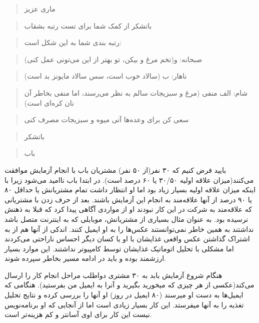 \begin{quote}
ماری عزیز
\end{quote}

\begin{quote}
باتشکر از کمک شما برای تست رتبه بشقاب
\end{quote}

\begin{quote}
رتبه بندی شما به این شکل است:
\end{quote}

\begin{quote}
صبحانه: و(تخم مرغ و بیکن، تو بهتر از این می‌تونی عمل کنی)
\end{quote}

\begin{quote}
ناهار: ب (سالاد خوب است، سس سالاد مایونز بد است)
\end{quote}

\begin{quote}
شام: الف منفی (مرغ و سبزیجات سالم به نظر می‌رسند، اما منفی بخاطر آن نان
کره‌ای است)
\end{quote}

\begin{quote}
سعی کن برای وعده‌ها آتی میوه و سبزیجات مصرف کنی
\end{quote}

\begin{quote}
باتشکر
\end{quote}

\begin{quote}
باب
\end{quote}

بایید فرض کنیم که ۳۰ نفر(از ۵۰ نفر) مشتریان باب با انجام آزمایش موافقت
می‌کنند(میزان علاقه اولیه ۳۰/۵۰ یا ۶۰ درصد است). در ابتدا باب ناامید
می‌شود زیرا با اینکه میزان علاقه اولیه بسیار زیاد بود اما او انتظار داشت
تمام مشتریانش یا حداقل ۸۰ یا ۹۰ درصد از آنها علاقه‌مند به انجام این
آزمایش باشند. بعد از حرف زدن با مشتریانی که علاقه‌مند به شرکت در این کار
نبودند او از مواردی آگاهی پیدا کرد که قبلا به ذهنش نرسیده بود. به عنوان
مثال بسیاری از مشتریانش، موبایلی که به اینترنت متصل باشد نداشتند به همین
خاطر نمی‌توانستند عکس‌ها را به او ایمیل کنند. اندکی از آنها هم از به
اشتراک گذاشتن عکس واقعی غذایشان با او یا کسان دیگر احساس ناراحتی
می‌کردند اما مشکلی با تحلیل اتوماتیک غذایشان توسط کامپیوتر نداشتند. این
موارد بسیار ارزشمند بوده و باید در ادامه مسیر بخاطر سپرده شوند.

هنگام شروع آزمایش بابد به ۳۰ مشتری دواطلب مراحل انجام کار را ارسال
می‌کند(عکسی از هر چیزی که میخورید بگیرید و آنرا به ایمیل من بفرستید).
هنگامی که ایمیل‌ها به دست او میرسند (۸۰ ایمیل در روز) او آنها را بررسی
کرده و نتایج تحلیل تغذیه را به آنها میفرستد. این کار بسیار زیادی است اما
از آنجایی که او برنامه‌نویس نیست این کار برای اوی آسانتر و کم هزینه‌تر
است.

